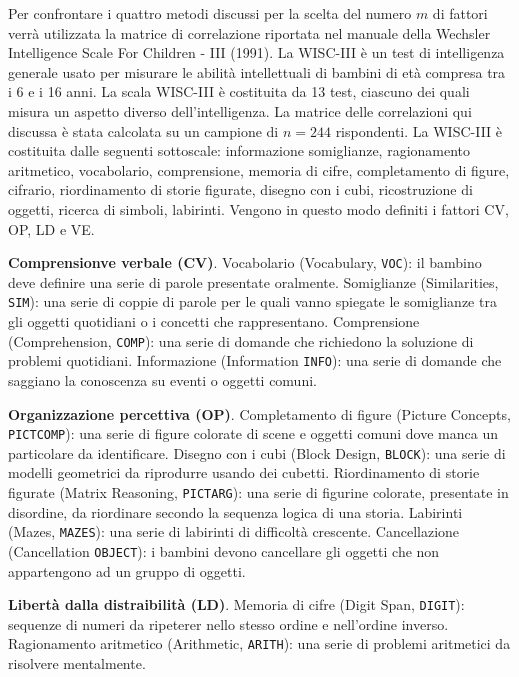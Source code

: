 \begin{exmp}  Per confrontare i quattro metodi discussi per la scelta del numero $m$
di fattori verrà utilizzata la matrice di correlazione riportata nel
manuale della Wechsler Intelligence Scale For Children - III
(1991). 
La WISC-III è un test di intelligenza generale usato per
misurare le abilità intellettuali di bambini di età compresa tra i 6 e
i 16 anni. La scala WISC-III è costituita da 13 test, ciascuno dei
quali misura un aspetto diverso dell'intelligenza. La matrice delle
correlazioni qui discussa è stata calcolata su un campione
di $n = 244$ rispondenti.  La WISC-III è costituita dalle seguenti sottoscale: informazione somiglianze, ragionamento aritmetico, vocabolario, comprensione,
memoria di cifre, completamento di figure, cifrario, riordinamento di
storie figurate, disegno con i cubi, ricostruzione di oggetti, ricerca
di simboli, labirinti. Vengono in questo modo definiti i fattori CV, OP, LD e VE. 

\textbf{Comprensionve verbale (CV)}.  Vocabolario (Vocabulary, {\tt VOC}): il bambino deve definire
  una serie di parole presentate oralmente.
 Somiglianze (Similarities, {\tt SIM}): una serie di coppie di
  parole per le quali vanno spiegate le somiglianze tra gli oggetti
  quotidiani o i concetti che rappresentano.
 Comprensione (Comprehension, {\tt COMP}): una serie di domande
  che richiedono la soluzione di problemi quotidiani.
 Informazione (Information  {\tt INFO}): una serie di domande che
  saggiano la conoscenza su eventi o oggetti comuni.
  
\textbf{Organizzazione percettiva (OP)}.  Completamento di figure (Picture Concepts, \texttt{PICTCOMP}): una
  serie di figure colorate di scene e oggetti comuni dove manca un
  particolare da identificare.
 Disegno con i cubi (Block Design, \texttt{BLOCK}): una serie di
  modelli geometrici da riprodurre usando dei cubetti.
 Riordinamento di storie figurate (Matrix Reasoning, \texttt{PICTARG}): una serie di figurine colorate, presentate in
  disordine, da riordinare secondo la sequenza logica di una storia. 
 Labirinti (Mazes, \texttt{MAZES}): una serie di labirinti di
  difficoltà crescente.
 Cancellazione (Cancellation \texttt{OBJECT}): i bambini devono
  cancellare gli oggetti che non appartengono ad un gruppo di oggetti.
  
\textbf{Libertà dalla distraibilità (LD)}.  Memoria di cifre (Digit Span, \texttt{DIGIT}): sequenze di numeri da
  ripeterer nello stesso ordine e nell'ordine inverso.
 Ragionamento aritmetico (Arithmetic, \texttt{ARITH}): una serie di
  problemi aritmetici da risolvere mentalmente.
  

\end{exmp}
